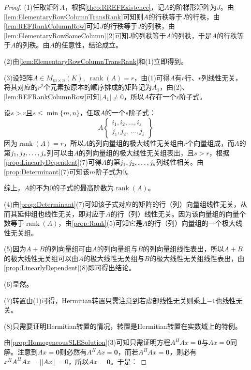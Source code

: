 \begin{proof}
	(1)任取矩阵$A$，根据\cref{theo:RREFExistence}，记$A$的阶梯形矩阵为$J$。由\cref{lem:ElementaryRowColumnTransRank}可知则$A$的行秩等于$J$的行秩，由\cref{lem:REFRankColumnRow}可知$J$的行秩等于$J$的列秩，由\cref{lem:ElementaryRowSameColumn}(2)可知$J$的列秩等于$A$的列秩，于是$A$的行秩等于$A$的列秩。由$A$的任意性，结论成立。\par
	(2)由\cref{lem:ElementaryRowColumnTransRank}和(1)立即得到。\par
	(3)设矩阵$A\in M_{m\times n}(K),\;\operatorname{rank}(A)=r$，由(1)可得$A$有$r$行、$r$列线性无关，将其对应的$r^2$个元素按原本的顺序排成的矩阵记为$A_1$，由(2)、\cref{lem:REFRankColumnRow}可知$|A_1|\ne0$，所以$A$存在一个$r$阶子式。\par
	设$s>r$且$s\leqslant\min\{m,n\}$，任取$A$的一个$s$阶子式：
	\begin{equation*}
		A\left\{ \begin{array}{l}
			i_1,i_2,\dots,i_s \\
			j_1,j_2,\ \dots,j_s
		\end{array}\right\}
	\end{equation*}
	因为$\operatorname{rank}(A)=r$，所以$A$的列向量组的极大线性无关组由$r$个向量组成，而$A$的第$j_1, j_2, \dots, j_{s}$列可以由$A$的列向量组的极大线性无关组表出，且$s>r$，根据\cref{prop:LinearlyDependent}(7)可得$A$的第$j_1, j_2, \dots, j_{s}$列线性相关。由\cref{prop:Determinant}(7)可知该$m$阶子式为$0$。\par
	综上，$A$的不为$0$的子式的最高阶数为$\operatorname{rank}(A)$。\par
	(4)由\cref{prop:Determinant}(7)可知该子式对应的矩阵的行（列）向量组线性无关，从而其延伸组也线性无关，即对应于$A$的行（列）线性无关。因为该向量组的向量个数等于$\operatorname{rank}(A)$，由\cref{prop:Rank}(5)可知它是$A$的行（列）向量组的一个极大线性无关组。\par
	(5)因为$A+B$的列向量组可由$A$的列向量组与$B$的列向量组线性表出，所以$A+B$的极大线性无关组可以由$A$的极大线性无关组与$B$的极大线性无关组线性表出，由\cref{prop:LinearlyDependent}(8)即可得出结论。\par
	(6)显然。\par
	(7)转置由(1)可得，Hermitian转置只需注意到若虚部线性无关则乘上$-1$也线性无关。\par
	(8)只需要证明Hermitian转置的情况，转置是Hermitian转置在实数域上的特例。\par
	由\cref{prop:HomogeneousSLESolution}(3)可知只需证明方程$A^HAx=\mathbf{0}$与$Ax=\mathbf{0}$同解。注意到$Ax=\mathbf{0}$则必然有$A^HAx=\mathbf{0}$，而若$A^HAx=\mathbf{0}$，则必有$x^HA^HAx=||Ax||=0$，所以$Ax=\mathbf{0}$。于是：

\end{proof}
